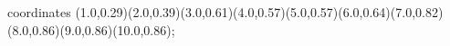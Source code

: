 					coordinates { (1.0,0.29)(2.0,0.39)(3.0,0.61)(4.0,0.57)(5.0,0.57)(6.0,0.64)(7.0,0.82)(8.0,0.86)(9.0,0.86)(10.0,0.86)};